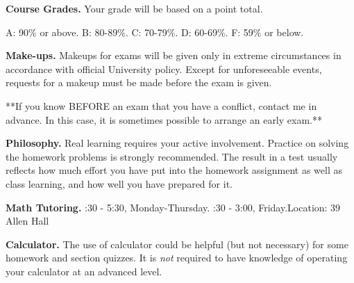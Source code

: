\documentclass[12pt]{article}
\begin{document}
\vspace{0.15in}
\noindent
{\bf Course Grades.} 
Your grade will be based on a point total.

A: 90$\%$ or above. \quad B: 80-89$\%$. \quad C: 70-79$\%$. \quad D: 60-69$\%$.\quad 
F: 59$\%$ or below.

\vspace{0.15in}
\noindent
{\bf Make-ups.} Makeups for exams will be given
only in extreme circumstances in
accordance with official University policy. Except for unforeseeable
events, requests for a makeup must be made
before the exam is given. 

**If you know BEFORE an exam that you have a conflict, 
contact me in advance. In this case, it is sometimes 
possible to arrange an early exam.**

\newpage
\vspace{0.19in}
\noindent
{\bf Philosophy.} 
Real learning requires your active involvement. 
Practice on solving the homework problems is strongly recommended.
The result in a test usually reflects how much effort you have put into 
the homework assignment as well as class learning, and how well you have prepared for it. 


\vspace{0.195in}
\noindent
{\bf  Math Tutoring.} :30 - 5:30, Monday-Thursday. :30 - 3:00, Friday.\qquad Location:  39 Allen Hall 

\vspace{0.195in}
\noindent
{\bf Calculator.}
The use of calculator could be helpful (but not necessary)  for some homework and 
section quizzes.
  It is \emph{not} required to have
 knowledge of operating your calculator at an advanced level.

\end{document}
